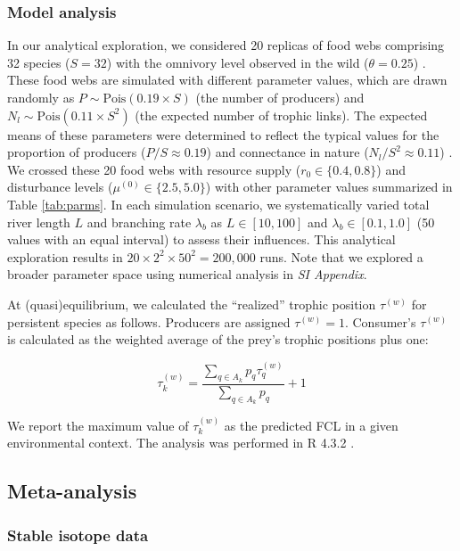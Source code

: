 \documentclass[11pt, class=article, crop=false]{standalone}
\begin{document}
\subsubsection{Model analysis}

In our analytical exploration, we considered 20 replicas of food webs comprising 32 species ($S = 32$) with the omnivory level observed in the wild ($\theta = 0.25$) \cite{johnson_trophic_2014}.
These food webs are simulated with different parameter values, which are drawn randomly as $P \sim \mbox{Pois}(0.19 \times S)$ (the number of producers) and $N_l \sim \mbox{Pois}(0.11 \times S^2)$ (the expected number of trophic links).
The expected means of these parameters were determined to reflect the typical values for the proportion of producers ($P / S \approx 0.19$) \citep{briand_community_1984} and connectance in nature ($N_l / S^2 \approx 0.11$) \citep{dunne_food-web_2002}.
We crossed these 20 food webs with resource supply ($r_0 \in \{0.4, 0.8\}$) and disturbance levels ($\mu^{(0)} \in \{2.5, 5.0\}$) with other parameter values summarized in Table \ref{tab:parms}.
In each simulation scenario, we systematically varied total river length $L$ and branching rate $\lambda_b$ as $L \in [10, 100]$ and $\lambda_b \in [0.1, 1.0]$ (50 values with an equal interval) to assess their influences.
This analytical exploration results in $20 \times 2^2 \times 50^2 = 200,000$ runs.
Note that we explored a broader parameter space using numerical analysis in \textit{SI Appendix}.

At (quasi)equilibrium, we calculated the ``realized'' trophic position $\tau^{(w)}$ for persistent species as follows.
Producers are assigned $\tau^{(w)} = 1$.
Consumer's $\tau^{(w)}$ is calculated as the weighted average of the prey's trophic positions plus one:

\begin{equation}
    \tau^{(w)}_k = \frac{\sum_{q \in A_{k}} p_{q} \tau^{(w)}_q}{\sum_{q \in A_{k}} p_{q}} + 1
    \label{eq:def_tp}
\end{equation}

We report the maximum value of $\tau_k^{(w)}$ as the predicted FCL in a given environmental context.
The analysis was performed in R 4.3.2 \citep{r_program}.

\subsection{Meta-analysis}

\subsubsection{Stable isotope data}
\end{document}

